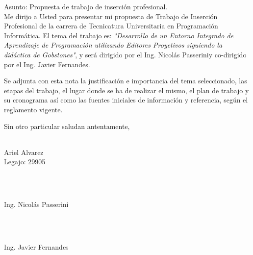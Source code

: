 \documentclass[10pt,stdletter]{newlfm}
\newcommand{\firma}[1]{%
  \vspace{2cm}
  \parbox{6cm}{
    \centering
    \hdashrule{6cm}{1pt}{1pt}\\
     #1
  }\textbf{}
}
\def \tipTitulo     {Desarrollo de un Entorno Integrado de Aprendizaje de Programación utilizando Editores Proyetivos siguiendo la didáctica de Gobstones}
\def \tipDirector   {Ing. Nicolás Passerini}
\def \tipCodirector {Ing. Javier Fernandes}
\def \alumnoLegajo  {29905}
\def \alumnoNombre  {Ariel Alvarez}
\def \cierre {%
    Sin otro particular saludan antentamente,
    \begin{center}
      \firma{\alumnoNombre \\ Legajo: \alumnoLegajo}\\
      \firma{\tipDirector}\\
      \firma{\tipCodirector}\\ 
    \end{center}
}
\begin{document}
\begin{newlfm}

Asunto: Propuesta de trabajo de inserción profesional.\\

Me dirijo a Usted para presentar mi propuesta de Trabajo de Inserción Profesional de la carrera de Tecnicatura Universitaria en Programación Informática. 
El tema del trabajo es: \textit{"\tipTitulo"}, y será dirigido por el \tipDirector y co-dirigido por el \tipCodirector.

Se adjunta con esta nota la justificación e importancia del tema seleccionado, las etapas del trabajo, el lugar donde se ha de realizar el mismo, el plan de trabajo y su cronograma así como las fuentes iniciales de información y referencia, según el reglamento vigente.

\cierre
\end{newlfm}
\end{document}
